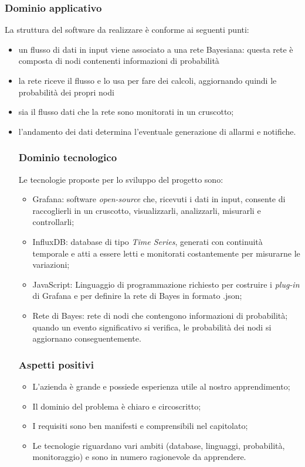 \subsubsection{Dominio applicativo}
La struttura del software da realizzare è conforme ai seguenti punti: 
\begin{itemize}
	\item un flusso di dati in input viene associato a una rete Bayesiana: questa rete è composta di nodi contenenti informazioni di probabilità
	\item la rete riceve il flusso e lo usa per fare dei calcoli, aggiornando quindi le probabilità dei propri nodi
	\item sia il flusso dati che la rete sono monitorati in un cruscotto;
	\item l'andamento dei dati determina l'eventuale generazione di allarmi e notifiche.
\subsubsection{Dominio tecnologico}
Le tecnologie proposte per lo sviluppo del progetto sono:
\begin{itemize}
	\item Grafana: software \textit{open-source} che, ricevuti i dati in input, consente di raccoglierli in un cruscotto, visualizzarli, analizzarli, misurarli e controllarli;
	\item InfluxDB: database di tipo \textit{Time Series}, generati con continuità temporale e atti a essere letti e monitorati costantemente per misurarne le variazioni;
	\item JavaScript: Linguaggio di programmazione richiesto per costruire i \textit{plug-in} di Grafana e per definire la rete di Bayes in formato .json;
	\item Rete di Bayes: rete di nodi che contengono informazioni di probabilità; quando un evento significativo si verifica, le probabilità dei nodi si aggiornano conseguentemente.
\end{itemize}
\subsubsection{Aspetti positivi}
\begin{itemize}
	\item L'azienda è grande e possiede esperienza utile al nostro apprendimento;
	\item Il dominio del problema è chiaro e circoscritto;
	\item I requisiti sono ben manifesti e comprensibili nel capitolato;
	\item Le tecnologie riguardano vari ambiti (database, linguaggi, probabilità, monitoraggio) e sono in numero ragionevole da apprendere.
\begin{itemize}

\end{itemize}
\end{itemize}
\end{itemize}
